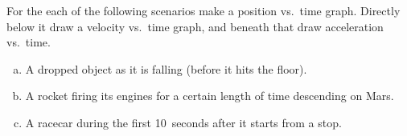 \label{fnt8.2.1-2}

For the each of the following scenarios make a position vs.\ time graph.  Directly below it draw a velocity vs.\ time graph, and beneath that draw acceleration vs.\ time. 

\begin{enumerate}[(a)]
	\item A dropped object as it is falling (before it hits the floor). 
	\item A rocket firing its engines for a certain length of time descending on Mars.
	\item A racecar during the first 10~seconds after it starts from a stop.
\end{enumerate}